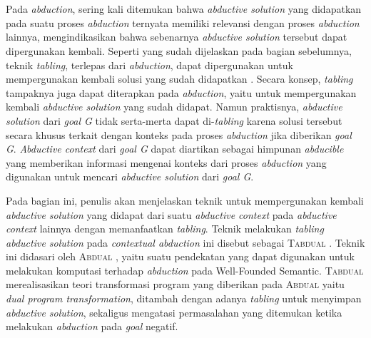 \chapter{\babTiga}

\addtocounter{babTigaNum}{3}

\label{bab3}

Pada \textit{abduction}, sering kali ditemukan bahwa \textit{abductive solution} yang didapatkan pada suatu proses \textit{abduction} ternyata memiliki relevansi dengan proses \textit{abduction} lainnya, mengindikasikan bahwa sebenarnya \textit{abductive solution} tersebut dapat dipergunakan kembali. Seperti yang sudah dijelaskan pada bagian sebelumnya, teknik \textit{tabling}, terlepas dari \textit{abduction}, dapat dipergunakan untuk mempergunakan kembali solusi yang sudah didapatkan \citep{swift1999tabling}. Secara konsep, \textit{tabling} tampaknya juga dapat diterapkan pada \textit{abduction}, yaitu untuk mempergunakan kembali \textit{abductive solution} yang sudah didapat. Namun praktisnya, \textit{abductive solution} dari \textit{goal G} tidak serta-merta dapat di-\textit{tabling} karena solusi tersebut secara khusus terkait dengan konteks pada proses \textit{abduction} jika diberikan \textit{goal G}. \textit{Abductive context} dari \textit{goal G} dapat diartikan sebagai himpunan \textit{abducible} yang memberikan informasi mengenai konteks dari proses \textit{abduction} yang digunakan untuk mencari \textit{abductive solution} dari \textit{goal G}.

Pada bagian ini, penulis akan menjelaskan teknik untuk mempergunakan kembali \textit{abductive solution} yang didapat dari suatu \textit{abductive context} pada \textit{abductive context} lainnya dengan memanfaatkan \textit{tabling}. Teknik melakukan \textit{tabling abductive solution} pada \textit{contextual abduction} ini disebut sebagai \textsc{Tabdual} \citep{saptawijaya2015tabdual}. Teknik ini didasari oleh \textsc{Abdual} \citep{alferes2004abduction}, yaitu suatu pendekatan yang dapat digunakan untuk melakukan komputasi terhadap \textit{abduction} pada Well-Founded Semantic. \textsc{Tabdual} merealisasikan teori transformasi program yang diberikan pada \textsc{Abdual} yaitu \textit{dual program transformation}, ditambah dengan adanya  \textit{tabling} untuk menyimpan \textit{abductive solution}, sekaligus mengatasi permasalahan yang ditemukan ketika melakukan \textit{abduction} pada \textit{goal} negatif. 

